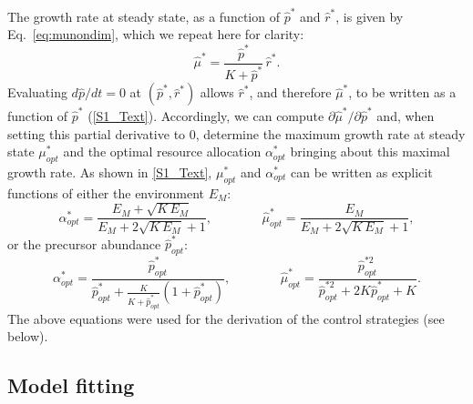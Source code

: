 The growth rate at steady state, as a function of $\hat{p}^*$ and $\hat{r}^*$, is given by Eq.~\ref{eq:munondim}, which we repeat here for clarity:
\begin{equation*}
\hat{\mu}^* = \frac{\hat{p}^*}{K + \hat{p}^*} \, \hat{r}^* .
\end{equation*}
Evaluating $d\hat{p}/dt=0$ at $(\hat{p}^*, \hat{r}^*)$ allows $\hat{r}^*$, and therefore $\hat{\mu}^*$, to be written as a function of $\hat{p}^*$ (\ref{S1_Text}).
Accordingly, we can compute $\partial\hat{\mu}^*/\partial\hat{p}^*$ and, when setting this partial derivative to 0, determine the maximum growth rate at steady state $\mu_{opt}^*$ and the optimal resource allocation $\alpha_{opt}^*$ bringing about this maximal growth rate.
As shown in \ref{S1_Text}, $\mu_{opt}^*$ and $\alpha_{opt}^*$ can be written as explicit functions of either the environment $E_M$:
\begin{equation}
\label{eq:alpha_mu_optimal}
\alpha_{opt}^* = \frac{E_M + \sqrt{K\, E_M}}{E_M + 2\sqrt{K\, E_M} + 1}
, \;\;\;\;\;\;\;\;\;\;\;\;\;\; 
\hat{\mu}^*_{opt} = \frac{E_M}{E_M + 2\sqrt{K\, E_M} + 1},
\end{equation}
or the precursor abundance $\hat{p}_{opt}^*$:
\begin{equation}
\label{eq:alpha_mu_optimal_p}
\alpha_{opt}^* = \frac{\hat{p}^{*}_{opt}}{\hat{p}^{*}_{opt} + \frac{K}{K+\hat{p}^{*}_{opt}}(1+\hat{p}^{*}_{opt})}
, \;\;\;\;\;\;\;\;\;\;\;\;\;\; 
\hat{\mu}^*_{opt} = \frac{\hat{p}^{* 2}_{opt}}{\hat{p}^{* 2}_{opt} + 2K\hat{p}^*_{opt} + K}.
\end{equation}
The above equations were used for the derivation of the control strategies (see below).


\subsection{Model fitting}
\label{sec:methods_model_fitting}


